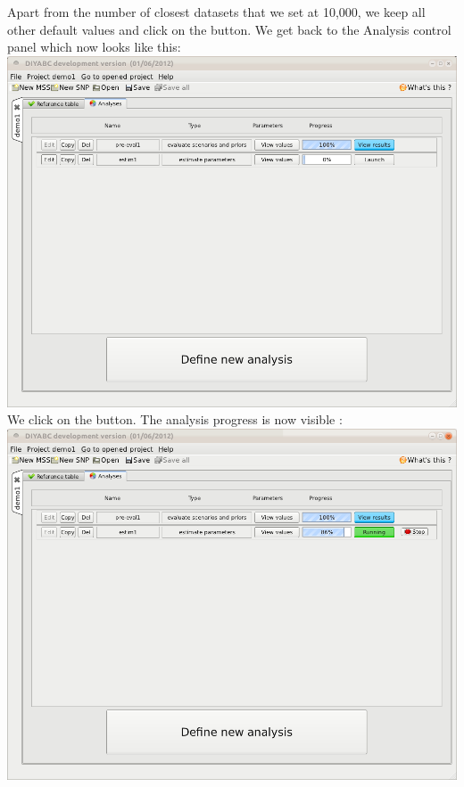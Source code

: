 Apart from the number of closest datasets that we set at 10,000, we keep all other default values and click on the  button. We get back to the Analysis control panel which now looks like this:\\

\includegraphics[scale=0.35]{gui_pictures/Capture-DIYABC-38.png} \\

\newpage
We click on the  button. The analysis progress is now visible :\\

\includegraphics[scale=0.35]{gui_pictures/Capture-DIYABC-38a.png} \\

